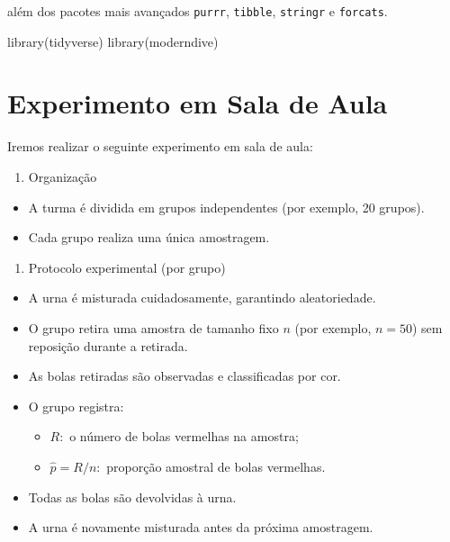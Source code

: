 \documentclass[
  letterpaper,
  DIV=11,
  numbers=noendperiod]{scrreprt}
\newenvironment{Shaded}{\begin{snugshade}}{\end{snugshade}}
\newcommand{\FunctionTok}[1]{\textcolor[rgb]{0.28,0.35,0.67}{#1}}
\newcommand{\NormalTok}[1]{\textcolor[rgb]{0.00,0.23,0.31}{#1}}
\providecommand{\tightlist}{%
  \setlength{\itemsep}{0pt}\setlength{\parskip}{0pt}}\usepackage{longtable,booktabs,array}
\begin{document}
além dos pacotes mais avançados \texttt{purrr}, \texttt{tibble},
\texttt{stringr} e \texttt{forcats}.

\begin{Shaded}
\begin{Highlighting}[]
\FunctionTok{library}\NormalTok{(tidyverse)}
\FunctionTok{library}\NormalTok{(moderndive)}
\end{Highlighting}
\end{Shaded}

\section{Experimento em Sala de Aula}\label{experimento-em-sala-de-aula}

Iremos realizar o seguinte experimento em sala de aula:

\begin{enumerate}
\def\labelenumi{\arabic{enumi}.}
\tightlist
\item
  Organização
\end{enumerate}

\begin{itemize}
\item
  A turma é dividida em grupos independentes (por exemplo, 20 grupos).
\item
  Cada grupo realiza uma única amostragem.
\end{itemize}

\begin{enumerate}
\def\labelenumi{\arabic{enumi}.}
\setcounter{enumi}{1}
\tightlist
\item
  Protocolo experimental (por grupo)
\end{enumerate}

\begin{itemize}
\item
  A urna é misturada cuidadosamente, garantindo aleatoriedade.
\item
  O grupo retira uma amostra de tamanho fixo \(n\) (por exemplo,
  \(n=50\)) sem reposição durante a retirada.
\item
  As bolas retiradas são observadas e classificadas por cor.
\item
  O grupo registra:

  \begin{itemize}
  \tightlist
  \item
    \(R:\) o número de bolas vermelhas na amostra;
  \item
    \(\hat{p} = R/n:\) proporção amostral de bolas vermelhas.
  \end{itemize}
\item
  Todas as bolas são devolvidas à urna.
\item
  A urna é novamente misturada antes da próxima amostragem.
\end{itemize}
\end{document}
